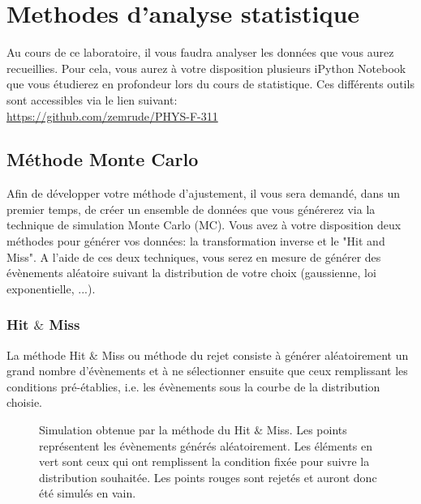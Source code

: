\section{Methodes d'analyse statistique}

Au cours de ce laboratoire, il vous faudra analyser les données que vous aurez recueillies. Pour cela, vous aurez à votre disposition plusieurs iPython Notebook que vous étudierez en profondeur lors du cours de statistique. Ces différents outils sont accessibles via le lien suivant:\\
\url{https://github.com/zemrude/PHYS-F-311}

\subsection{Méthode Monte Carlo}
Afin de développer votre méthode d'ajustement, il vous sera demandé, dans un premier temps,  de créer un ensemble de données que vous générerez via la technique de simulation Monte Carlo (MC). Vous avez à votre disposition deux méthodes pour générer vos données: la transformation inverse et le "Hit and Miss". A l'aide de ces deux techniques, vous serez en mesure de générer des évènements aléatoire suivant la distribution de votre choix (gaussienne, loi exponentielle, ...).

\subsubsection{Hit $\&$ Miss}
La méthode Hit $\&$ Miss ou méthode du rejet consiste à générer aléatoirement un grand nombre d'évènements et à ne sélectionner ensuite que ceux remplissant les conditions pré-établies, i.e. les évènements sous la courbe de la distribution choisie. 

\begin{figure}[h!]
\caption{Simulation obtenue par la méthode du Hit $\&$ Miss. Les points représentent les évènements générés aléatoirement. Les éléments en vert sont ceux qui ont remplissent la condition fixée pour suivre la distribution souhaitée. Les points rouges sont rejetés et auront donc été simulés en vain.}
\label{fig:HitMiss}
\end{figure}

